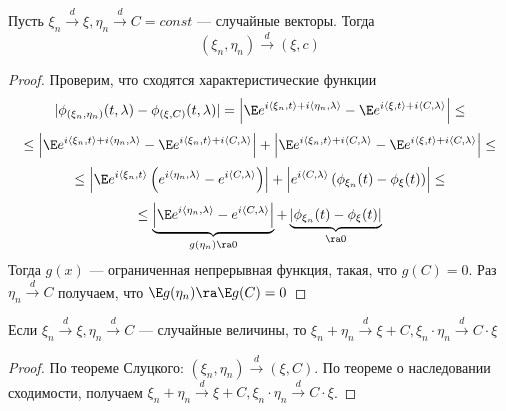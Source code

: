 \begin{theorem}[Слуцкий]
    Пусть \(\xi_n \xrightarrow{d} \xi, \eta_n \xrightarrow{d} C = const\) --- случайные векторы. Тогда
    \[(\xi_n, \eta_n) \xrightarrow{d} (\xi, c)\]
\end{theorem}
\begin{proof}
    Проверим, что сходятся характеристические функции 
    \[|\phi_{(\xi_n, \eta_n)}(t, \lambda) - \phi_{(\xi, C)}(t, \lambda)| = \left|\E e^{i\langle \xi_n, t \rangle + i\langle \eta_n, \lambda \rangle} - \E e^{i\langle \xi, t \rangle + i\langle C, \lambda \rangle}\right| \le\]
    \[\le \left|\E e^{i\langle \xi_n, t \rangle + i\langle \eta_n, \lambda \rangle} - \E e^{i\langle \xi_n, t \rangle + i\langle C, \lambda \rangle}\right| + \left|\E e^{i\langle \xi_n, t \rangle + i\langle C, \lambda \rangle} - \E e^{i\langle \xi, t \rangle + i\langle C, \lambda \rangle}\right| \le\]
    \[\le \left| \E e^{i\langle \xi_n, t \rangle} \left( e^{i\langle \eta_n, \lambda \rangle} - e^{i\langle C, \lambda \rangle} \right) \right| + \left| e^{i\langle C, \lambda \rangle} \left( \phi_{\xi_n}(t) - \phi_\xi(t) \right) \right| \le \]
    \[\le \underbrace{\left| \E e^{i\langle \eta_n, \lambda \rangle} - e^{i\langle C, \lambda \rangle} \right|}_{g(\eta_n) \ra 0} + \underbrace{\left| \phi_{\xi_n}(t) - \phi_\xi(t) \right|}_{\ra 0}\]
    Тогда \(g(x)\) --- ограниченная непрерывная функция, такая, что \(g(C) = 0\). Раз \(\eta_n \xrightarrow{d} C\) получаем, что \(\E g(\eta_n) \ra \E g(C) = 0\)
\end{proof}

\begin{corollary}
    Если \(\xi_n \xrightarrow{d} \xi, \eta_n \xrightarrow{d} C\) --- случайные величины, то \(\xi_n + \eta_n \xrightarrow{d} \xi + C, \xi_n\cdot\eta_n \xrightarrow{d} C\cdot\xi\)
\end{corollary}
\begin{proof}
    По теореме Слуцкого: \((\xi_n, \eta_n) \xrightarrow{d} (\xi, C)\). По теореме о наследовании сходимости, получаем \(\xi_n + \eta_n \xrightarrow{d} \xi + C, \xi_n\cdot\eta_n \xrightarrow{d} C\cdot\xi\).
\end{proof}

